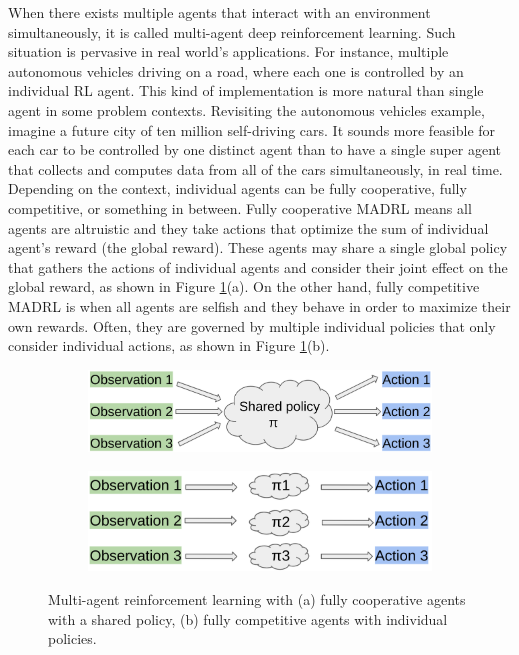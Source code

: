 \documentclass[conference]{IEEEtran}
\begin{document}
When there exists multiple agents that interact with an environment simultaneously, it is called multi-agent deep reinforcement learning. Such situation is pervasive in real world's applications. For instance, multiple autonomous vehicles driving on a road, where each one is controlled by an individual RL agent. This kind of implementation is more natural than single agent in some problem contexts. Revisiting the autonomous vehicles example, imagine a future city of ten million self-driving cars. It sounds more feasible for each car to be controlled by one distinct agent than to have a single super agent that collects and computes data from all of the cars simultaneously, in real time. Depending on the context, individual agents can be fully cooperative, fully competitive, or something in between. Fully cooperative MADRL means all agents are altruistic and they take actions that optimize the sum of individual agent's reward (the global reward). These agents may share a single global policy that gathers the actions of individual agents and consider their joint effect on the global reward, as shown in Figure \ref{fig:marl}(a). On the other hand, fully competitive MADRL is when all agents are selfish and they behave in order to maximize their own rewards. Often, they are governed by multiple individual policies that only consider individual actions, as shown in Figure \ref{fig:marl}(b).

\begin{figure}[h!]
    \centering
    \begin{subfigure}[b]{0.48\textwidth}
        \includegraphics[width=\textwidth]{figures/coop.png}
        \caption{}
    \end{subfigure}
    \hfill %
    \begin{subfigure}[b]{0.48\textwidth}
        \includegraphics[width=\textwidth]{figures/comp.png}
        \caption{}
    \end{subfigure}
    \caption{Multi-agent reinforcement learning with (a) fully cooperative agents with a shared policy, 
    (b) fully competitive agents with individual policies.}
    \label{fig:marl}
\end{figure}
\end{document}
